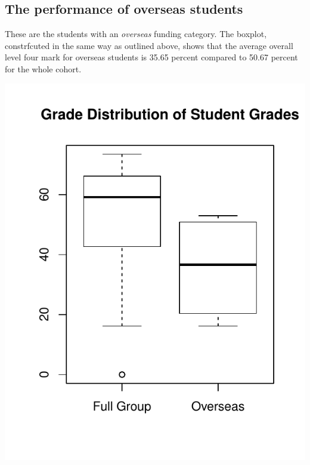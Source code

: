 \documentclass[12pt, a4paper, oneside]{article}\usepackage[]{graphicx}\usepackage[]{color}
\makeatletter
\def\maxwidth{ %
  \ifdim\Gin@nat@width>\linewidth
    \linewidth
  \else
    \Gin@nat@width
  \fi
}
\newenvironment{knitrout}{}{} %
\makeatother
\begin{document}
\subsection*{The performance of overseas students}
These are the students with an \emph{overseas} funding category.  The boxplot, constrfcuted in the same way as outlined above, shows that the average overall level four mark for overseas students is 35.65 percent compared to 50.67 percent for the whole cohort.  

\begin{knitrout}
\color{fgcolor}
\includegraphics[width=\maxwidth]{figure/boxplot3} 

\end{knitrout}
\end{document}
